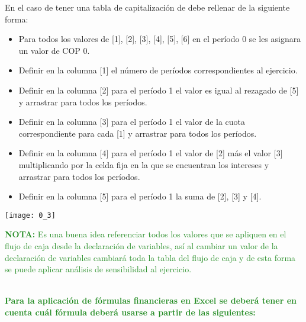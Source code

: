 \begin{enumerate}
	      En el caso de tener una tabla de capitalización de debe rellenar de la siguiente forma:
	      \begin{itemize}
		      \color{ForestGreen}
		      \item Para todos los valores de [1], [2], [3], [4], [5], [6] en el período 0 se les asignara un valor de  COP 0.
		      \item Definir en la columna [1] el número de períodos correspondientes al ejercicio.
		      \item Definir en la columna [2] para el período 1 el valor es igual al rezagado de [5] y arrastrar para todos los períodos.
		      \item Definir en la columna [3] para el período 1 el valor de la cuota correspondiente para cada [1] y arrastrar para todos los períodos.
		      \item Definir en la columna [4] para el período 1 el valor de [2] más el valor [3] multiplicando por la celda fija en la que se encuentran los intereses y arrastrar para todos los períodos.
		      \item Definir en la columna [5] para el período 1 la suma de [2], [3] y [4].
	      \end{itemize}
	      \begin{center}
		      \texttt{[image: 0\_3]}
	      \end{center}
	      \textcolor{ForestGreen}{\textbf{NOTA:} Es una buena idea referenciar todos los valores que se apliquen en el flujo de caja desde la declaración de variables, así al cambiar un valor de la declaración de variables cambiará toda la tabla del flujo de caja y de esta forma se puede aplicar análisis de sensibilidad al ejercicio.} \\ \\
	      
	      \textcolor{ForestGreen}{\item \textbf{Para la aplicación de fórmulas financieras en Excel se deberá tener en cuenta cuál fórmula deberá usarse a partir de las siguientes:}} \\
	      

\end{enumerate}
